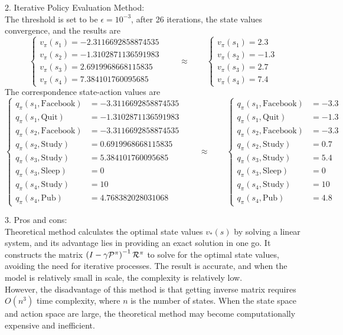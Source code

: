 \begin{homeworkProblem}
2. Iterative Policy Evaluation Method: \\
The threshold is set to be $\epsilon=10^{-3}$, after 26 iterations, the state values convergence, and the results are
$$\begin{cases}
v_{\pi}(s_1) = -2.3116692858874535 \\
v_{\pi}(s_2) = -1.3102871136591983 \\
v_{\pi}(s_3) = 2.6919968668115835 \\
v_{\pi}(s_4) = 7.384101760095685
\end{cases}
\qquad\approx\qquad\begin{cases}
v_{\pi}(s_1) = 2.3 \\
v_{\pi}(s_2) = -1.3 \\
v_{\pi}(s_3) = 2.7 \\
v_{\pi}(s_4) = 7.4
\end{cases}$$
The correspondence state-action values are
$$\begin{cases}
q_{\pi}(s_1, \text{Facebook}) &= -3.3116692858874535 \\
q_{\pi}(s_1, \text{Quit}) &= -1.3102871136591983 \\
q_{\pi}(s_2, \text{Facebook}) &= -3.3116692858874535 \\
q_{\pi}(s_2, \text{Study}) &= 0.6919968668115835 \\
q_{\pi}(s_3, \text{Study}) &= 5.384101760095685 \\
q_{\pi}(s_3, \text{Sleep}) &= 0 \\
q_{\pi}(s_4, \text{Study}) &= 10 \\
q_{\pi}(s_4, \text{Pub}) &= 4.768382028031068
\end{cases} \qquad\approx\qquad \begin{cases}
q_{\pi}(s_1, \text{Facebook}) &= -3.3 \\
q_{\pi}(s_1, \text{Quit}) &= -1.3 \\
q_{\pi}(s_2, \text{Facebook}) &= -3.3 \\
q_{\pi}(s_2, \text{Study}) &= 0.7 \\
q_{\pi}(s_3, \text{Study}) &= 5.4 \\
q_{\pi}(s_3, \text{Sleep}) &= 0 \\
q_{\pi}(s_4, \text{Study}) &= 10 \\
q_{\pi}(s_4, \text{Pub}) &= 4.8
\end{cases}$$

3. Pros and cons: \\
Theoretical method calculates the optimal state values $v_*(s)$ by solving a linear system, and its advantage lies in providing an exact solution in one go. It constructs the matrix $\left(I-\gamma\mathcal{P}^{\pi}\right)^{-1}\mathcal{R}^{\pi}$ to solve for the optimal state values, avoiding the need for iterative processes. The result is accurate, and when the model is  relatively small in scale, the complexity is relatively low. \\
However, the disadvantage of this method is that getting inverse matrix requires $O(n^3)$ time complexity, where $n$ is the number of states. When the state space and action space are large, the theoretical method may become computationally expensive and inefficient. \\


\end{homeworkProblem}
